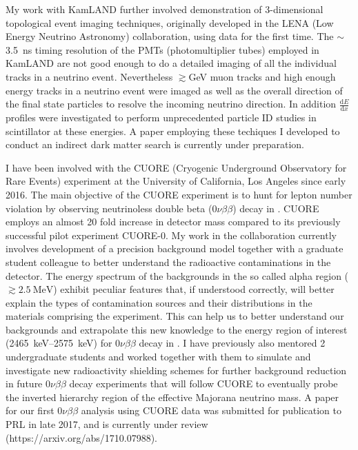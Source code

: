 \documentclass[10pt]{article} %
\begin{document}
My work with KamLAND further involved demonstration of 3-dimensional
topological event imaging techniques, originally developed in the LENA (Low
Energy Neutrino Astronomy) collaboration, using data for the first time. The
$\sim$\SI{3.5}{\nano\second} timing resolution of the PMTs (photomultiplier
tubes) employed in KamLAND are not good enough to do a detailed imaging of all
the individual tracks in a neutrino event. Nevertheless
$\gtrsim$\si{\giga\electronvolt} muon tracks and high enough energy tracks in a
neutrino event were imaged as well as the overall direction of the final state
particles to resolve the incoming neutrino direction. In addition
$\frac{\mathrm{d}E}{\mathrm{d}x}$ profiles were investigated to perform
unprecedented particle ID studies in scintillator at these energies. A paper
employing these techiques I developed to conduct an indirect dark matter search
is currently under preparation.

I have been involved with the CUORE (Cryogenic Underground Observatory for Rare
Events) experiment at the University of California, Los Angeles since early
2016. The main objective of the CUORE experiment is to hunt for lepton number
violation by observing neutrinoless double beta ($0\nu\beta\beta$) decay in
. CUORE employs an almost 20 fold increase in detector mass
compared to its previously successful pilot experiment CUORE-0. My work in the
collaboration currently involves development of a precision background model
together with a graduate student colleague to better understand the radioactive
contaminations in the detector. The energy spectrum of the backgrounds in the
so called alpha region ($\gtrsim \SI{2.5}{\mega\electronvolt}$) exhibit
peculiar features that, if understood correctly, will better explain the types
of contamination sources and their distributions in the materials comprising
the experiment. This can help us to better understand our backgrounds and
extrapolate this new knowledge to the energy region of interest
(\SIrange{2465}{2575}{\kilo\electronvolt}) for $0\nu\beta\beta$ decay in
. I have previously also mentored 2 undergraduate students and
worked together with them to simulate and investigate new radioactivity
shielding schemes for further background reduction in future $0\nu\beta\beta$
decay experiments that will follow CUORE to eventually probe the inverted
hierarchy region of the effective Majorana neutrino mass.
A paper for our first $0\nu\beta\beta$ analysis using CUORE data
was submitted for publication to PRL in late 2017, and is currently under
review (https://arxiv.org/abs/1710.07988).
\end{document}
